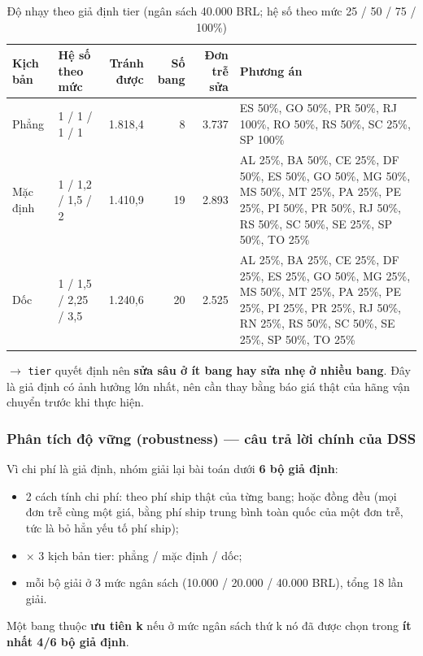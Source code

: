 \documentclass[12pt,a4paper]{report}
\newcommand{\code}[1]{\texttt{#1}}
\renewcommand{\_}{\oldunderscore\allowbreak}
\begin{document}
\begin{table}[H]
\centering\small
\caption{Độ nhạy theo giả định tier (ngân sách 40.000 BRL; hệ số theo mức 25 / 50 / 75 / 100\%)}
\begin{tabular}{lL{2.3cm}rrrL{4.6cm}}
\toprule
Kịch bản & Hệ số theo mức & Tránh được & Số bang & Đơn trễ sửa & Phương án \\
\midrule
Phẳng & 1 / 1 / 1 / 1 & 1.818,4 & 8 & 3.737 & ES 50\%, GO 50\%, PR 50\%, RJ 100\%, RO 50\%, RS 50\%, SC 25\%, SP 100\% \\
Mặc định & 1 / 1,2 / 1,5 / 2 & 1.410,9 & 19 & 2.893 & AL 25\%, BA 50\%, CE 25\%, DF 50\%, ES 50\%, GO 50\%, MG 50\%, MS 50\%, MT 25\%, PA 25\%, PE 25\%, PI 50\%, PR 50\%, RJ 50\%, RS 50\%, SC 50\%, SE 25\%, SP 50\%, TO 25\% \\
Dốc & 1 / 1,5 / 2,25 / 3,5 & 1.240,6 & 20 & 2.525 & AL 25\%, BA 25\%, CE 25\%, DF 25\%, ES 25\%, GO 50\%, MG 25\%, MS 50\%, MT 25\%, PA 25\%, PE 25\%, PI 25\%, PR 25\%, RJ 50\%, RN 25\%, RS 50\%, SC 50\%, SE 25\%, SP 50\%, TO 25\% \\
\bottomrule
\end{tabular}
\end{table}

$\rightarrow$ \code{tier} quyết định nên \textbf{sửa sâu ở ít bang hay sửa nhẹ ở nhiều bang}. Đây là giả định có ảnh hưởng lớn nhất, nên cần thay bằng báo giá thật của hãng vận chuyển trước khi thực hiện.

\subsubsection*{Phân tích độ vững (robustness) --- câu trả lời chính của DSS}

Vì chi phí là giả định, nhóm giải lại bài toán dưới \textbf{6 bộ giả định}:
\begin{itemize}
\item 2 cách tính chi phí: theo phí ship thật của từng bang; hoặc đồng đều (mọi đơn trễ cùng một giá, bằng phí ship trung bình toàn quốc của một đơn trễ, tức là bỏ hẳn yếu tố phí ship);
\item $\times$ 3 kịch bản tier: phẳng / mặc định / dốc;
\item mỗi bộ giải ở 3 mức ngân sách (10.000 / 20.000 / 40.000 BRL), tổng 18 lần giải.
\end{itemize}
Một bang thuộc \textbf{ưu tiên k} nếu ở mức ngân sách thứ k nó đã được chọn trong \textbf{ít nhất 4/6 bộ giả định}.
\end{document}
